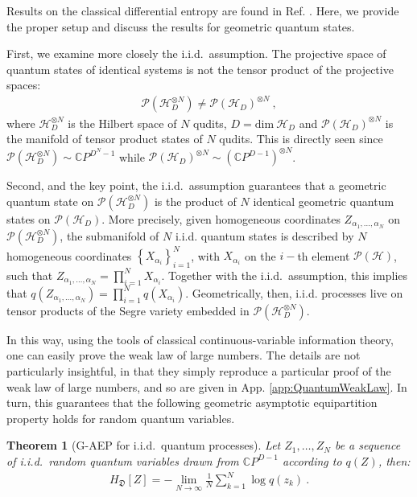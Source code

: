 \documentclass[draft,nofootinbib,pre,twocolumn,showkeys,superscriptaddress,preprintnumbers,floatfix]{revtex4-1}
\newtheorem{theorem}{Theorem}
\newcommand{\1}{\mathbbm{1}}
\newcommand{\PH}{\mathcal{P}(\mathcal{H})}
\newcommand{\CP}[1]{\mathbb{C}P^{#1}}
\newcommand{\DD}{\mathfrak{D}}
\newcommand{\iid}{i.i.d.\xspace}
\begin{document}
Results on the classical differential entropy are found in Ref. \cite{Cove91a}.
Here, we provide the proper setup and discuss the results for geometric quantum
states.

First, we examine more closely the \iid~assumption. The projective space of
quantum states of identical systems is not the tensor product of the projective
spaces:
\begin{align*}
\mathcal{P}(\mathcal{H}_D^{\otimes N} ) \neq  \mathcal{P}(\mathcal{H}_D)^{\otimes N}
  ~,
\end{align*}
where $\mathcal{H}_D^{\otimes N}$ is the Hilbert space of $N$ qudits, 
$D=\mathrm{dim} ~\mathcal{H}_D$ and $\mathcal{P}(\mathcal{H}_D)^{\otimes N}$ 
is the manifold of tensor product states of $N$ qudits. This is directly seen 
since $\mathcal{P}(\mathcal{H}_D^{\otimes N} ) \sim \mathbb{C}P^{D^N-1}$ while
$\mathcal{P}(\mathcal{H}_D)^{\otimes N} \sim (\mathbb{C}P^{D-1})^{\otimes N}$.

Second, and the key point, the \iid~assumption guarantees that a geometric
quantum state on $\mathcal{P}(\mathcal{H}_D^{\otimes N} )$ is the product of
$N$ identical geometric quantum states on $\mathcal{P}(\mathcal{H}_D)$. More
precisely, given homogeneous coordinates $Z_{\alpha_1,\ldots,\alpha_N}$ on
$\mathcal{P}(\mathcal{H}_D^{\otimes N} )$, the submanifold of $N$ \iid quantum 
states is described by $N$ homogeneous coordinates $\left\{X_{\alpha_i}
\right\}_{i=1}^N$, with $X_{\alpha_i}$ on the $i-$th element $\PH$, such that
$Z_{\alpha_1,\ldots,\alpha_N} = \prod_{i=1}^N X_{\alpha_i}$. Together with the
\iid~assumption, this implies that $q(Z_{\alpha_1,\ldots,\alpha_N}) =
\prod_{i=1}^N q (X_{\alpha_i})$. Geometrically, then, \iid processes live
on tensor products of the Segre variety embedded in
$\mathcal{P}(\mathcal{H}_D^{\otimes N})$.

In this way, using the tools of classical continuous-variable information
theory, one can easily prove the weak law of large numbers. The details are not
particularly insightful, in that they simply reproduce a particular proof of
the weak law of large numbers, and so are given in App.
\ref{app:QuantumWeakLaw}. In turn, this guarantees that the following geometric
asymptotic equipartition property holds for random quantum variables.

\begin{theorem}[G-AEP for \iid~quantum processes]
Let $Z_1,\ldots,Z_N$ be a sequence of \iid~random quantum variables drawn from
$\CP{D-1}$ according to $q(Z)$, then:
\begin{align*}
H_{\DD}[Z] = - \lim_{N \to \infty} \frac{1}{N} \sum_{k=1}^N \log q(z_k)
  ~.
\end{align*}
\end{theorem}
\end{document}
